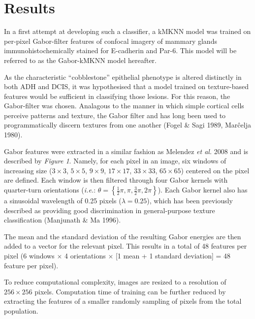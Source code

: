 \section{Results}
In a first attempt at developing such a classifier, a kMKNN model was trained on
per-pixel Gabor-filter features of confocal imagery of mammary glands
immunohistochemically stained for E-cadherin and Par-6. This model will be
referred to as the Gabor-kMKNN model hereafter.\par

As the characteristic ``cobblestone'' epithelial phenotype is altered distinctly
in both ADH and DCIS, it was hypothesised that a model trained on texture-based
features would be sufficient in classifying those lesions. For this reason, the
Gabor-filter was chosen. Analagous to the manner in which simple cortical cells
perceive patterns and texture, the Gabor filter and has long been used to
programmatically discern textures from one another
(Fogel \& Sagi 1989, Marĉelja 1980).\par

Gabor features were extracted in a similar fashion as Melendez \emph{et al.} 2008 and is described by \emph{Figure 1}. Namely, for each pixel in an image, six windows of increasing size ($3\times3$, $5\times5$, $9\times9$, $17\times17$, $33\times33$, $65\times65$) centered on the pixel are defined. Each window is then filtered through four Gabor kernels with quarter-turn orientations (\emph{i.e.}: $\theta = \left\{\frac{1}{2}\pi, \pi, \frac{3}{2}\pi, 2\pi \right\}$). Each Gabor kernel also has a sinusoidal wavelength of 0.25 pixels ($\lambda = 0.25$), which has been previously described as providing good discrimination in general-purpose texture classification
(Manjunath \& Ma 1996).\par


The mean and the standard deviation of the resulting Gabor energies are then
added to a vector for the relevant pixel. This results in a total of 48 features
per pixel (6 windows $\times$ 4 orientations $\times$ [1 mean + 1 standard deviation] = 48
feature per pixel).\par

To reduce computational complexity, images are resized to a resolution of
$256\times256$ pixels. Computation time of training can be further reduced by
extracting the features of a smaller randomly sampling of pixels from the
total population.

